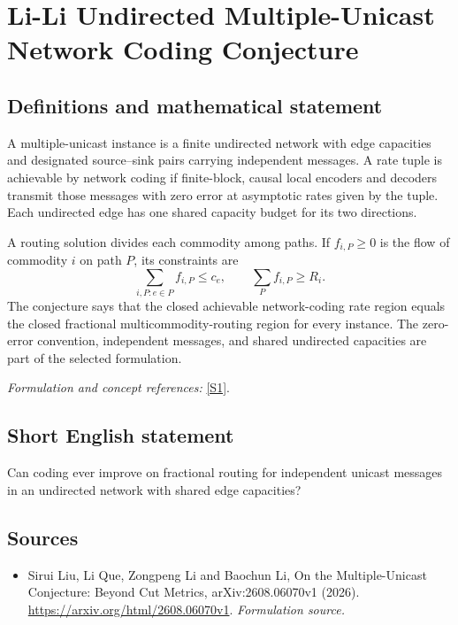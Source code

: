 \documentclass[11pt]{article}
\begin{document}
\section*{\texorpdfstring{Li-Li Undirected Multiple-Unicast Network Coding Conjecture}{Li-Li Undirected Multiple-Unicast Network Coding Conjecture}}\label{statement}
\subsection{Definitions and mathematical statement}
A multiple-unicast instance is a finite undirected network with edge capacities and designated source--sink pairs carrying independent messages. A rate tuple is achievable by network coding if finite-block, causal local encoders and decoders transmit those messages with zero error at asymptotic rates given by the tuple. Each undirected edge has one shared capacity budget for its two directions.

A routing solution divides each commodity among paths. If $f_{i,P}\ge0$ is the flow of commodity $i$ on path $P$, its constraints are
\[
 \sum_{i,P:e\in P}f_{i,P}\le c_e,
 \qquad \sum_Pf_{i,P}\ge R_i.
\]
The conjecture says that the closed achievable network-coding rate region equals the closed fractional multicommodity-routing region for every instance. The zero-error convention, independent messages, and shared undirected capacities are part of the selected formulation.
\par\smallskip\textit{Formulation and concept references:} \href{https://arxiv.org/html/2608.06070v1}{[S1]}.

\subsection{Short English statement}
Can coding ever improve on fractional routing for independent unicast messages in an undirected network with shared edge capacities?
\subsection{Sources}
\begin{itemize}
\item[S1]Sirui Liu, Li Que, Zongpeng Li and Baochun Li, On the Multiple-Unicast Conjecture: Beyond Cut Metrics, arXiv:2608.06070v1 (2026).
\url{https://arxiv.org/html/2608.06070v1}.
\textit{Formulation source.}
\end{itemize}
\end{document}
